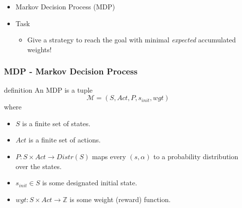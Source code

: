 \documentclass[onlymath]{beamer}
\begin{document}
\begin{frame}
\begin{itemize}
\begin{center}
	\end{center}
	\pause
	\item Markov Decision Process (MDP)
	\pause
	\item Task
	\begin{itemize}
		\item Give a strategy to reach the goal with minimal \textit{expected} accumulated weights!
	\end{itemize}
\end{itemize}
\end{frame}

\begin{frame}
	\frametitle{MDP - Markov Decision Process}
	\begin{block}{definition}
		An MDP is a tuple
		\[ \mathcal{M} = (S, Act, P, s_{init}, wgt)
		\]
		where
		\begin{itemize}
			\item $S$ is a finite set of states.
			\item $Act$ is a finite set of actions.
			\item $P: S \times Act \to Distr(S)$ maps every $(s,\alpha)$ to a probability distribution over the states.
			\item $s_{init} \in S$ is some designated initial state.
			\item $wgt : S \times Act \to \mathbb{Z}$ is some weight (reward) function.
		\end{itemize}
	\end{block}
\end{frame}
\end{document}
